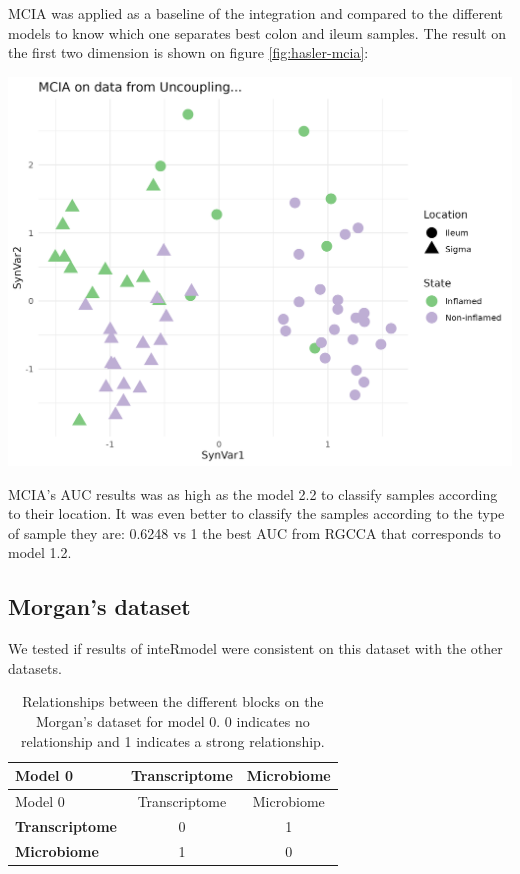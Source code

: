 \documentclass[
  a4paper,
]{book}
\let\origfigure\figure
\let\endorigfigure\endfigure
\renewenvironment{figure}[1][2] {
    \expandafter\origfigure\expandafter[!ht]
} {
    \endorigfigure
}
\begin{document}
MCIA was applied as a baseline of the integration and compared to the different models to know which one separates best colon and ileum samples.
The result on the first two dimension is shown on figure \ref{fig:hasler-mcia}:

\begin{figure}
\centering
\includegraphics{images/hasler-mcia.png}
\caption{\label{fig:hasler-mcia} MCIA first two dimensions of the dataset colored by state, the shape is according to the location of the samples. Shows two vertical groups on the first syntethic dimension according to the location of the samples.}
\end{figure}

MCIA's AUC results was as high as the model 2.2 to classify samples according to their location.
It was even better to classify the samples according to the type of sample they are: 0.6248 vs 1 the best AUC from RGCCA that corresponds to model 1.2.

\hypertarget{results-morgan}{%
\subsection{Morgan's dataset}\label{results-morgan}}

We tested if results of inteRmodel were consistent on this dataset with the other datasets.

\begin{longtable}[]{@{}lcc@{}}
\caption{\label{tab:morgan-model0} Relationships between the different blocks on the Morgan's dataset for model 0. 0 indicates no relationship and 1 indicates a strong relationship.}\tabularnewline
\toprule
Model 0 & Transcriptome & Microbiome \\
\midrule
\endfirsthead
\toprule
Model 0 & Transcriptome & Microbiome \\
\midrule
\endhead
\textbf{Transcriptome} & 0 & 1 \\
\textbf{Microbiome} & 1 & 0 \\
\bottomrule
\end{longtable}
\end{document}
